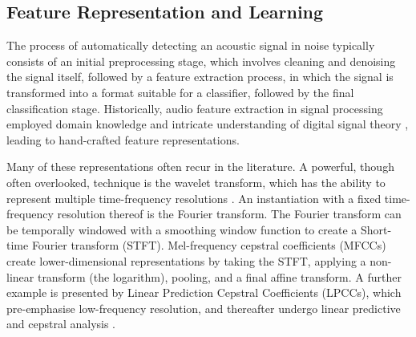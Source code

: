 \documentclass[10pt, twocolumn]{llncs}
\newcommand{\ikN}[1]{\todo[inline, size=\small, color=orange!30]{[ik] #1}}
\begin{document}
\subsection{Feature Representation and Learning}

\label{sub:dl}
The process of automatically detecting an acoustic signal in noise typically consists of an initial preprocessing stage, which involves cleaning and denoising the signal itself, followed by a feature extraction process, in which the signal is transformed into a format suitable for a classifier, followed by the final classification stage. 
Historically, audio feature extraction in signal processing employed domain knowledge and intricate understanding of digital signal theory \cite{humphrey2013feature}, leading to hand-crafted feature representations. 

Many of these representations often recur in the literature. A powerful, though often overlooked, technique is the wavelet transform, which has the ability to represent multiple time-frequency resolutions \cite[Ch. 9]{akay1998time}. An instantiation with a fixed time-frequency resolution thereof is the Fourier transform. The Fourier transform can be temporally windowed with a smoothing window function to create a Short-time Fourier transform (STFT). Mel-frequency cepstral coefficients (MFCCs) create lower-dimensional representations by taking the STFT, applying a non-linear transform (the logarithm), pooling, and a final affine transform. A further example is presented by Linear Prediction Cepstral Coefficients (LPCCs), which pre-emphasise low-frequency resolution, and thereafter undergo linear predictive and cepstral analysis \cite{ai2012classification}.  
\end{document}
